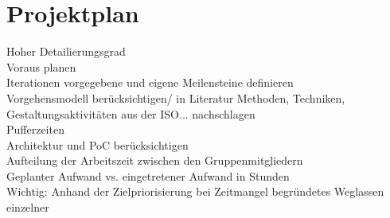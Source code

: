 
\section{Projektplan}

Hoher Detailierungsgrad\\
Voraus planen\\
Iterationen vorgegebene und eigene Meilensteine definieren\\
Vorgehensmodell berücksichtigen/ in Literatur Methoden, Techniken, Gestaltungsaktivitäten aus der ISO... nachschlagen\\
Pufferzeiten\\
Architektur und PoC berücksichtigen\\
Aufteilung der Arbeitszeit zwischen den Gruppenmitgliedern\\
Geplanter Aufwand vs. eingetretener Aufwand in Stunden\\
Wichtig: Anhand der Zielpriorisierung bei Zeitmangel begründetes Weglassen einzelner\\
